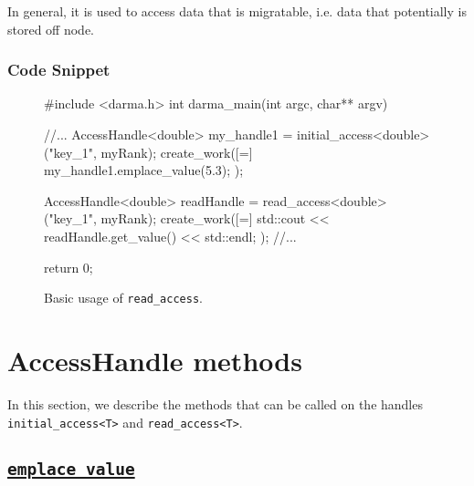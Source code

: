 \begin{subs}
In general, it is used to access data that is migratable, i.e. data 
that potentially is stored off node.


\subsubsection{Code Snippet} 
\begin{figure}[!h]
\begin{CppCodeNumb}
#include <darma.h>
int darma_main(int argc, char** argv)
{
	//...
  AccessHandle<double> my_handle1 = initial_access<double>("key_1", myRank);
  create_work([=]{
  	my_handle1.emplace_value(5.3);
  });

  AccessHandle<double> readHandle = read_access<double>("key_1", myRank);
  create_work([=]{
  	std::cout << readHandle.get_value() << std::endl;
  });
  //...

  return 0;
}
\end{CppCodeNumb}
\label{fig:fe_api_initialaccess}
\caption{Basic usage of \texttt{read\_access}.}
\end{figure}

\end{subs}














\clearpage
\section{AccessHandle methods}

In this section, we describe the methods that can be called 
on the handles \texttt{initial\_access<T>} and \texttt{read\_access<T>}.



\subsection{\underline{\texttt{emplace\_value}}}

